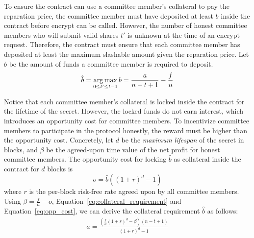 To ensure the contract can use a committee member's collateral to pay the reparation price, the committee member must have deposited at least $b$ inside the contract before \textsf{encrypt} can be called.
However, the number of honest committee members who will submit valid shares $t'$ is unknown at the time of an \textsf{encrypt} request.
Therefore, the contract must ensure that each committee member has deposited at least the maximum slashable amount given the reparation price.
Let $\hat{b}$ be the amount of funds a committee member is required to deposit.
\begin{equation}\label{eq:collateral_requirement}
    \hat{b} = \operatorname*{arg\,max}_{0 \leq t' \leq t - 1} b = \frac{a}{n - t + 1} - \frac{f}{n}
\end{equation}

Notice that each committee member's collateral is locked inside the contract for the lifetime of the secret.
However, the locked funds do not earn interest, which introduces an opportunity cost for committee members.
To incentivize committee members to participate in the protocol honestly, the reward must be higher than the opportunity cost.
Concretely, let $d$ be the \emph{maximum lifespan} of the secret in blocks, and $\beta$ be the agreed-upon time value of the net profit for honest committee members.
The opportunity cost for locking $\hat{b}$ as collateral inside the contract for $d$ blocks is
\begin{equation}\label{eq:opp_cost}
    o = \hat{b}((1 + r)^d - 1)
\end{equation}
where $r$ is the per-block risk-free rate agreed upon by all committee members.
Using $\beta = \frac{f}{n} - o$, Equation~\ref{eq:collateral_requirement} and Equation~\ref{eq:opp_cost}, we can derive the collateral requirement $\hat{b}$ as follows:
\begin{gather}\label{eq:collateral_from_holding_fee}
    a = \frac{(\frac{f}{n}(1 + r)^d - \beta)(n - t + 1)}{(1 + r)^d - 1}
\end{gather}

